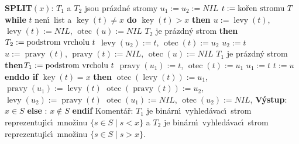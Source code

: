 \documentclass[a4paper,12pt]{article}
\DeclareMathOperator*{\otec}{otec}
\DeclareMathOperator*{\levy}{levy}
\DeclareMathOperator*{\pravy}{pravy}
\DeclareMathOperator*{\key}{key}
\begin{document}
{\bf SPLIT$(x)$}:\newline 
$T_1$ a $T_2$ jsou pr\'azdn\'e stromy\newline 
$u_1:=u_2:=NIL$\newline 
$t:=\text{\rm ko\v ren stromu }T$\newline 
{\bf while} $t$ nen\'\i\ list a $\key(t)\ne x$ {\bf do\newline}
\phantom{---}{\bf if} $\key(t)>x$ {\bf then\newline 
\phantom{------}$u:=\levy(t)$}, $\levy(t):=NIL$, $\otec(u):=NIL$\newline 
\phantom{------}{\bf if} $T_2$ je pr\'azdn\'y strom {\bf then}\newline \phantom{---------}$T_2:=\text{\rm podstrom vrcholu }t$\newline
\phantom{------}{\bf else}\newline 
\phantom{---------}$\levy(u_2):=t$, $\otec(t):=u_2$\newline 
\phantom{------}{\bf endif}\newline
\phantom{------}$u_2:=t$\newline 
\phantom{---}{\bf else}\newline 
\phantom{------}$u:=\pravy(t)$, $\pravy(t):=NIL$, $\otec(u):=NIL$\newline
\phantom{------}{\bf if} $T_1$ je pr\'azdn\'y strom {\bf then}\newline \phantom{---------}$T_1:=\text{\rm podstrom vrcholu }t$\newline
\phantom{------}{\bf else}\newline 
\phantom{---------}$\pravy(u_1):=t$, $\otec(t):=u_1$\newline 
\phantom{------}{\bf endif}\newline
\phantom{------}$u_1:=t$\newline 
\phantom{---}{\bf endif}\newline 
\phantom{---}$t:=u$\newline 
{\bf enddo\newline 
if} $\key(t)=x$ {\bf then}\newline 
\phantom{---}$\otec(\levy(t)):=u_1$, $\pravy(u_1):=\levy(t)$\newline 
\phantom{---}$\otec(\pravy(t)):=u_2$, $\levy(u_2):=\pravy(t)$\newline 
\phantom{---}$\otec(u_1):=NIL$, $\otec(u_2):=NIL$, {\bf V\'ystup}: $x\in S$\newline 
{\bf else}\newline 
\phantom{---}{\bf V\'ystup}: $x\notin S$\newline 
{\bf endif\newline }
Koment\'a\v r: $T_1$ je bin\'arn\'\i\ vyhled\'avac\'\i\ strom reprezentuj\'\i c\'\i\ 
mno\-\v zi\-nu 
$\{s\in S\mid s<x\}$ a $T_2$ je bin\'arn\'\i\ vyhled\'avac\'\i\ strom 
reprezentuj\'\i c\'\i\ mno\v zinu $\{s\in S\mid s>x\}$.
\medskip
\end{document}

